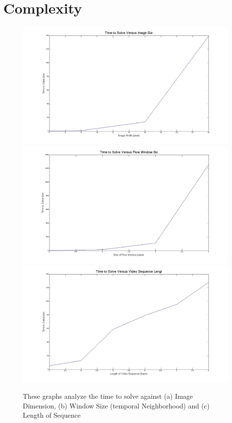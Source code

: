 \section{Complexity}

\begin{figure}[t]
\begin{centering}
\includegraphics[scale=0.125]{figures/time_vs_imsize.jpg}
\includegraphics[scale=0.125]{figures/time_vs_window.jpg}
\includegraphics[scale=0.125]{figures/time_vs_length.jpg}
\caption{These graphs analyze the time to solve against (a) Image Dimension, 
(b) Window Size (temporal Neighborhood) and (c) Length of Sequence }
\par\end{centering}
\end{figure}

